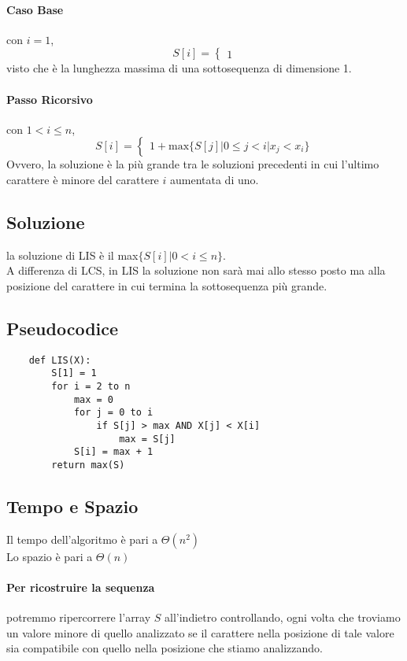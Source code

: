 \documentclass[12pt, a4paper, openany]{book}
\begin{document}
\paragraph*{Caso Base} con $i=1$,
 $$S[i]=\begin{cases}
	 1
 \end{cases}$$
visto che è la lunghezza massima di una sottosequenza di dimensione 1.
\paragraph*{Passo Ricorsivo} con $1<i\leq n$,
$$
S[i] = \begin{cases}
	1+\text{max}\{S[j] | 0 \leq j < i | x_j < x_i \}
\end{cases}
$$
Ovvero, la soluzione è la più grande tra le soluzioni precedenti in cui l'ultimo carattere è minore del carattere $i$ aumentata di uno.
\subsection*{Soluzione}
la soluzione di LIS è il max$\{S[i]| 0 < i \leq n\}$.
\\A differenza di LCS, in LIS la soluzione non sarà mai allo stesso posto ma alla posizione del carattere in cui termina la sottosequenza più grande.
\subsection*{Pseudocodice}
\begin{lstlisting}
	def LIS(X):
		S[1] = 1
		for i = 2 to n
			max = 0
			for j = 0 to i
				if S[j] > max AND X[j] < X[i]
					max = S[j]
			S[i] = max + 1
		return max(S) 

\end{lstlisting}

\subsection*{Tempo e Spazio}
Il tempo dell'algoritmo è pari a $\Theta(n^2)$
\\Lo spazio è pari a $\Theta(n)$

\paragraph*{Per ricostruire la sequenza} potremmo ripercorrere l'array $S$ all'indietro controllando,
ogni volta che troviamo un valore minore di quello analizzato se il carattere nella posizione di tale valore sia compatibile con quello nella posizione che stiamo analizzando.
\end{document}
